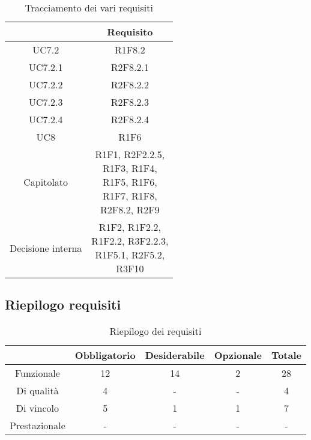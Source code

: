 \begin{table}[H]
	\centering
	\renewcommand{\arraystretch}{1.8}
	\begin{tabular}{c | c}
		\rowcolor[HTML]{125E28}
		\multicolumn{1}{c}{\color[HTML]{FFFFFF} \textbf{Fonte}} &
		\multicolumn{1}{c}{\color[HTML]{FFFFFF} \textbf{Requisito}} \\
		\hline
		UC7.2 & R1F8.2 \\ \hline
		UC7.2.1 & R2F8.2.1 \\ \hline
		UC7.2.2 & R2F8.2.2 \\ \hline
		UC7.2.3 & R2F8.2.3 \\ \hline
		UC7.2.4 & R2F8.2.4 \\ \hline
		UC8 & R1F6 \\ \hline
		Capitolato & \shortstack{R1F1, R2F2.2.5, \\R1F3, R1F4, \\R1F5, R1F6, \\R1F7, R1F8,\\ R2F8.2, R2F9}  \\ \hline
		Decisione interna & \shortstack{R1F2, R1F2.2,\\ R1F2.2, R3F2.2.3,\\ R1F5.1, R2F5.2,\\ R3F10} \\
	\end{tabular}
    \caption{Tracciamento dei vari requisiti}
\end{table}

\subsection{Riepilogo requisiti} \label{subsection: riepilogo}

\begin{table}[H]
    \centering
    \renewcommand{\arraystretch}{1.8}
    \begin{tabular}{c | c | c | c | c}
        \rowcolor[HTML]{125E28}
        \multicolumn{1}{c}{\color[HTML]{FFFFFF} \textbf{Tipologia}}          &
        \multicolumn{1}{c}{\color[HTML]{FFFFFF} \textbf{Obbligatorio}} &
        \multicolumn{1}{c}{\color[HTML]{FFFFFF} \textbf{Desiderabile}}     &
        \multicolumn{1}{c}{\color[HTML]{FFFFFF} \textbf{Opzionale}}     &
        \multicolumn{1}{c}{\color[HTML]{FFFFFF} \textbf{Totale}}                                                                                                                                             \\
        \hline
        Funzionale & 12 & 14 & 2 & 28 \\ \hline
        Di qualità & 4 & - & - & 4 \\ \hline
        Di vincolo & 5 & 1 & 1 & 7 \\ \hline
        Prestazionale & - & - & - & - \\ 
    \end{tabular}
    \caption{Riepilogo dei requisiti}
\end{table}